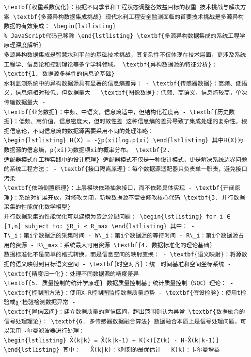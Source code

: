\begin{verbatim}
\textbf{权重系数优化}：根据不同季节和工程状态调整各效益目标的权重 技术挑战与解决方案 \textbf{多源异构数据集成挑战} 现代水利工程安全监测面临的首要技术挑战是多源异构数据的有效集成： \begin{lstlisting}
% JavaScript代码已移除 \end{lstlisting} \textbf{多源异构数据集成的系统工程学原理深度解析}
多源异构数据集成是智慧水利平台的基础技术挑战，其复杂性不仅体现在技术层面，更涉及系统工程学、信息论和控制理论等多个学科领域。 \textbf{异构数据源的特征分析}： \textbf{1. 数据源多样性的信息论基础}
水利监测系统中的异构数据源具有显著的信息熵差异： - \textbf{传感器数据}：高频、低语义，信息熵相对较低，但数据量大 - \textbf{图像数据}：低频、高语义，信息熵较高，单次传输数据量大 -
\textbf{业务数据}：中频、中语义，信息熵适中，但结构化程度高 - \textbf{历史数据}：低频、高价值，信息密度大，但时效性差 这种信息熵的差异导致了集成处理的复杂性。根据信息论，不同信息熵的数据源需要采用不同的处理策略：
\begin{lstlisting} H(X) = -∑p(xi)log₂p(xi) \end{lstlisting} 其中H(X)为数据源的信息熵，p(xi)为数据项xi的概率分布。 \textbf{2.
适配器模式在工程实践中的设计原理} 适配器模式不仅是一种设计模式，更是解决系统边界问题的系统工程方法： - \textbf{接口隔离原理}：每个数据源适配器只负责单一职责，避免接口污染 -
\textbf{依赖倒置原理}：上层模块依赖抽象接口，而不依赖具体实现 - \textbf{开闭原理}：系统对扩展开放，对修改关闭，新增数据源不需要修改核心代码 \textbf{3. 并行数据采集的性能优化数学模型}
并行数据采集的性能优化可以建模为资源分配问题： \begin{lstlisting} for i ∈ [1,n] subject to: ∑R_i ≤ R_max \end{lstlisting} 其中： -
T\_i：第i个数据源的采集时间 - W\_i：第i个数据源的等待时间 - R\_i：第i个数据源占用的资源 - R\_max：系统最大可用资源 \textbf{4. 数据标准化的理论基础}
数据标准化不是简单的格式转换，而是信息空间的映射变换： - \textbf{语义映射}：将源数据的语义映射到目标语义空间 - \textbf{时空对齐}：统一时间基准和空间坐标系统 - \textbf{精度归一化}：处理不同数据源的精度差异
\textbf{5. 质量控制的统计学原理} 数据质量控制基于统计质量控制（SQC）理论： - \textbf{控制图方法}：使用X-R控制图监控数据质量趋势 - \textbf{假设检验}：使用t检验或χ²检验检测数据异常 -
\textbf{置信区间}：建立数据质量的置信区间，超出范围则认为异常 \textbf{数据融合的信号处理理论}： \textbf{6. 多传感器数据融合算法} 数据融合本质上是信号处理问题，可以采用卡尔曼滤波器进行处理：
\begin{lstlisting} X̂(k|k) = X̂(k|k-1) + K(k)[Z(k) - H·X̂(k|k-1)] \end{lstlisting} 其中： - X̂(k|k)：k时刻的最优估计 - K(k)：卡尔曼增益 -

\end{verbatim}
